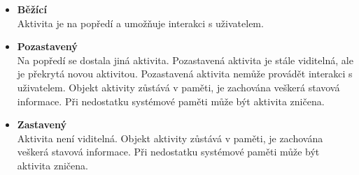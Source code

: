 \documentclass{diplomka}
\begin{document}
\begin{itemize}[]
\item \textbf{Běžící}\\
Aktivita je na popředí a umožňuje interakci s uživatelem.
\item \textbf{Pozastavený}\\
Na popředí se dostala jiná aktivita. Pozastavená aktivita je stále viditelná, ale je překrytá novou aktivitou. Pozastavená aktivita nemůže provádět interakci s uživatelem. Objekt aktivity zůstává v paměti, je zachována veškerá stavová informace. Při nedostatku systémové paměti může být aktivita zničena.
\item \textbf{Zastavený}\\
Aktivita není viditelná. Objekt aktivity zůstává v paměti, je zachována veškerá stavová informace. Při nedostatku systémové paměti může být aktivita zničena.
\end{itemize}
\end{document}
